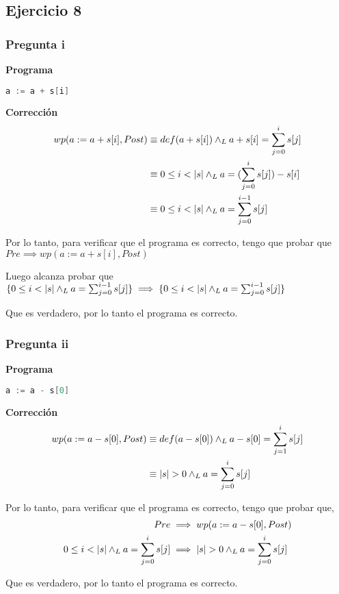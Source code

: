 \subsection{Ejercicio 8}

\subsubsection{Pregunta i}
\textbf{Programa}

\begin{lstlisting}[language = C++]
    a := a + s[i]
\end{lstlisting}

\textbf{Corrección}
\begin{align*}
    wp(a := a + s[i], Post) &\equiv def(a + s[i]) \land _L a + s[i] = \sum_{j=0}^{i}s[j] \\
    &\equiv 0 \leq i < |s| \land _L a = (\sum_{j=0}^{i}s[j]) - s[i] \\
    &\equiv 0 \leq i < |s| \land _L a = \sum_{j=0}^{i-1}s[j] \\
\end{align*}

Por lo tanto, para verificar que el programa es correcto, tengo que probar que $ Pre \implies wp(a := a + s[i], Post) $

Luego alcanza probar que $ \{ 0 \leq i < |s| \land _L a = \sum_{j=0}^{i-1}s[j] \} \implies \{ 0 \leq i < |s| \land _L a = \sum_{j=0}^{i-1}s[j] \} $

Que es verdadero, por lo tanto el programa es correcto.

\subsubsection{Pregunta ii}

\textbf{Programa}

\begin{lstlisting}[language = C++]
    a := a - s[0]
\end{lstlisting}

\textbf{Corrección}
\begin{align*}
    wp(a := a - s[0], Post) &\equiv def(a - s[0]) \land _L a - s[0] = \sum_{j = 1}^{i}s[j] \\
    &\equiv |s| > 0 \land _L a = \sum_{j = 0}^{i}s[j]
\end{align*}

Por lo tanto, para verificar que el programa es correcto, tengo que probar que,
\begin{align*}
    Pre &\implies wp(a := a - s[0], Post) \\
    0 \leq i < |s| \land _L a = \sum_{j = 0}^{i}s[j] &\implies |s| > 0 \land _L a = \sum_{j = 0}^{i}s[j]
\end{align*}

Que es verdadero, por lo tanto el programa es correcto.



